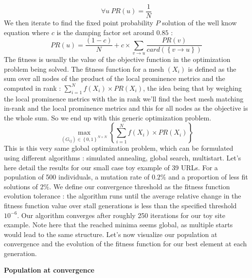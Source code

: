 \documentclass{iSWAGArticle}
\begin{document}
  \begin{equation}
  \forall u \ PR\left(u\right)=\frac{1}{N}
  \end{equation} 
  We then iterate to find the fixed point probability $P$ solution of the well know equation where $c$ is the damping factor set around $0.85$ :
  \begin{equation}
  PR\left(u\right)= \frac{\left(1-c\right)}{N} + c \times \sum_{v \rightarrow u}\frac{PR\left(v\right)}{card\left(\left\{v\rightarrow u\right\}\right)}
  \end{equation}
  The fitness is usually the value of the objective function in the optimization problem being solved.
  The fitness function for a mesh $\left(X_i\right)$ is defined as the sum over all nodes of the product of the local prominence metrics
  and the computed in rank : $\sum^{N}_{i=1} f\left(X_i\right)\times PR(X_i)$, the idea being that by weighing the local prominence metrics with the in rank
  we'll find the best mesh matching in-rank and the local prominence metrics and this for all nodes as the objective is the whole sum. 
  So we end up with this generic optimization problem.
  \begin{equation}
  \max_{\left(G_{ij}\right)  \in \left\{0,1\right\}^{N\times N}}\left\{ \sum^{N}_{i=1} f\left(X_i\right)\times PR(X_i)\right\}
  \end{equation}
  This is this very same global optimization problem, which can be formulated using different algorithms : simulated annealing, global search, multistart.
  Let's here detail the results for our small case toy example of 39 URLs.
  For a population of 500 individuals, a mutation rate of $0.2 \%$ and a proportion of less fit solutions of $2\%$.
  We define our convergence threshold as the fitness function evolution tolerance : the algorithm runs until the average relative change in the fitness function value over stall generations is less than the specified 
  threshold $10^{-6}$.
  Our algorithm converges after roughly 250 iterations for our toy site example. Note here that the reached minima seems global, as multiple starts
  would lead to the same structure.
  Let's now visualize our population at convergence and the evolution of the fitness function for our best element at each generation.
  \begin{center}
  \textbf{\large Population at convergence}
  \end{center}
  \begin{center}
  \end{center}
\end{document}
